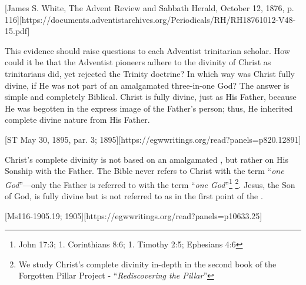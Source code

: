 [James S. White, The Advent Review and Sabbath Herald, October 12, 1876, p. 116][https://documents.adventistarchives.org/Periodicals/RH/RH18761012-V48-15.pdf]

This evidence should raise questions to each Adventist trinitarian scholar. How could it be that the Adventist pioneers adhere to the divinity of Christ as trinitarians did, yet rejected the Trinity doctrine? In which way was Christ fully divine, if He was not part of an amalgamated three-in-one God? The answer is simple and completely Biblical. Christ is fully divine, just as His Father, because He was begotten in the express image of the Father’s person; thus, He inherited complete divine nature from His Father.

[ST May 30, 1895, par. 3; 1895][https://egwwritings.org/read?panels=p820.12891]

Christ's complete divinity is not based on an amalgamated , but rather on His Sonship with the Father. The Bible never refers to Christ with the term “\textit{one God}”—only the Father is referred to with the term “\textit{one God}”\footnote{John 17:3; 1. Corinthians 8:6; 1. Timothy 2:5; Ephesians 4:6} \footnote{We study Christ’s complete divinity in-depth  in the second book of the Forgotten Pillar Project - “\textit{Rediscovering the Pillar}”}. Jesus, the Son of God, is fully divine but is not referred to as  in the first point of the .

[Ms116-1905.19; 1905][https://egwwritings.org/read?panels=p10633.25]

